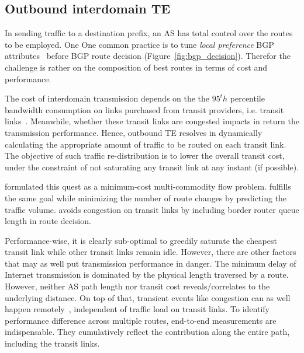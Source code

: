 \subsection{Outbound interdomain TE}
In sending traffic to a destination prefix, an AS has total control over the routes to be employed. One One common practice is to tune \textit{local preference} BGP attributes~\cite{Wang2008} before BGP route decision (Figure~\ref{fig:bgp_decision}). 
Therefor the challenge is rather on the composition of best routes in terms of cost and performance.

The cost of interdomain transmission depends on the the $95^th$ percentile bandwidth consumption on links purchased from transit providers, i.e. transit links~\cite{drpeering-95th}.
Meanwhile, whether these transit links are congested impacts in return the transmission performance.
Hence, outbound TE resolves in dynamically calculating the appropriate amount of traffic to be routed on each transit link.
The objective of such traffic re-distribution is to lower the overall transit cost, under the constraint of not saturating any transit link at any instant (if possible).

\citet{Goldenberg2004} formulated this quest as a minimum-cost multi-commodity flow problem.
\citet{Uhlig2004b} fulfills the same goal while minimizing the number of route changes by predicting the traffic volume.
\citet{Zhu2014} avoids congestion on transit links by including border router queue length in route decision.

Performance-wise, it is clearly sub-optimal to greedily saturate the cheapest transit link while other transit links remain idle.
However, there are other factors that may as well put transmission performance in danger.
The minimum delay of Internet transmission is dominated by the physical length traversed by a route. 
However, neither AS path length nor transit cost reveals/correlates to the underlying distance.
On top of that, transient events like congestion can as well happen remotely~\cite{Akella2003, Luckie2014}, independent of traffic load on transit links.
To identify performance difference across multiple routes, end-to-end measurements are indispensable.
They cumulatively reflect the contribution along the entire path, including the transit links.


